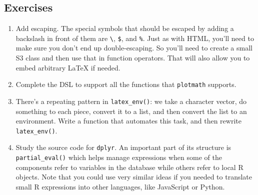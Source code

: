 \begin{Shaded}
\begin{Highlighting}[]
\StringTok{ }
  \StringTok{ }
  \StringTok{ }\NormalTok{(}
  \StringTok{ }

  \StringTok{ }

  \StringTok{ }
  \StringTok{ }\NormalTok{(}
  \StringTok{ } 

  \StringTok{ } 
\NormalTok{\}}

\NormalTok{(}\StringTok{ }
\end{Highlighting}
\end{Shaded}

\subsection{Exercises}

\begin{enumerate}
\def\labelenumi{\arabic{enumi}.}
\item
  Add escaping. The special symbols that should be escaped by adding a
  backslash in front of them are \texttt{\textbackslash{}}, \texttt{\$},
  and \texttt{\%}. Just as with HTML, you'll need to make sure you don't
  end up double-escaping. So you'll need to create a small S3 class and
  then use that in function operators. That will also allow you to embed
  arbitrary LaTeX if needed.
\item
  Complete the DSL to support all the functions that \texttt{plotmath}
  supports.
\item
  There's a repeating pattern in \texttt{latex\_env()}: we take a
  character vector, do something to each piece, convert it to a list,
  and then convert the list to an environment. Write a function that
  automates this task, and then rewrite \texttt{latex\_env()}.
\item
  Study the source code for \texttt{dplyr}. An important part of its
  structure is \texttt{partial\_eval()} which helps manage expressions
  when some of the components refer to variables in the database while
  others refer to local R objects. Note that you could use very similar
  ideas if you needed to translate small R expressions into other
  languages, like JavaScript or Python.
\end{enumerate}
